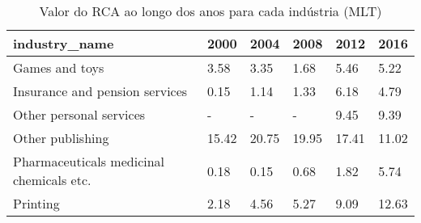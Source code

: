 \begin{table}
\centering
\caption{Valor do RCA ao longo dos anos para cada indústria (MLT)}
\begin{tabular}{p{6cm}p{1.5cm}p{1.5cm}p{1.5cm}p{1.5cm}p{1.5cm}}
\toprule
                           industry\_name &  2000 &  2004 &  2008 &  2012 &  2016 \\
\midrule
                          Games and toys &  3.58 &  3.35 &  1.68 &  5.46 &  5.22 \\
          Insurance and pension services &  0.15 &  1.14 &  1.33 &  6.18 &  4.79 \\
                 Other personal services &     - &     - &     - &  9.45 &  9.39 \\
                        Other publishing & 15.42 & 20.75 & 19.95 & 17.41 & 11.02 \\
Pharmaceuticals medicinal chemicals etc. &  0.18 &  0.15 &  0.68 &  1.82 &  5.74 \\
                                Printing &  2.18 &  4.56 &  5.27 &  9.09 & 12.63 \\
\bottomrule
\end{tabular}
\end{table}
